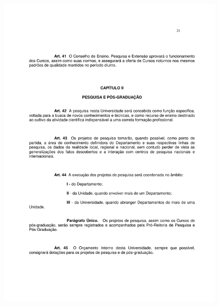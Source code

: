 \begin{figure}[p]
	\centering 
	\includegraphics[scale=0.7]{capitulos/resolucoes/cuni414/cuni414-21.pdf}
\end{figure}

